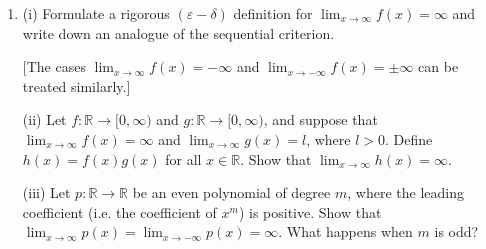 \documentclass[letterpaper,10pt,english]{jupyterBook}
\begin{document}
\label{\detokenize{Problems:id12}}\begin{enumerate}
%
\setcounter{enumi}{11}
\item {} 
\sphinxAtStartPar
(i) Formulate a rigorous \((\varepsilon-\delta)\) definition for \(\displaystyle\lim_{x \rightarrow \infty}f(x) = \infty\) and write down an analogue of the  sequential criterion.

\sphinxAtStartPar
{[}The cases \(\displaystyle\lim_{x \rightarrow \infty}f(x) = -\infty\) and \(\displaystyle\lim_{x \rightarrow -\infty}f(x) = \pm \infty\) can be treated similarly.{]}

\sphinxAtStartPar
(ii) Let \(f:\mathbb{R} \rightarrow [0, \infty)\) and \(g:\mathbb{R} \rightarrow [0, \infty)\), and suppose that \(\displaystyle\lim_{x \rightarrow \infty}f(x) = \infty\) and \(\displaystyle\lim_{x \rightarrow \infty}g(x) = l\), where \(l > 0\). Define \(h(x) = f(x)g(x)\) for all \(x \in \mathbb{R}\). Show that \(\displaystyle\lim_{x \rightarrow \infty}h(x) = \infty\).

\sphinxAtStartPar
(iii) Let \(p: \mathbb{R} \rightarrow \mathbb{R}\) be an even polynomial of degree \(m\), where the leading coefficient (i.e. the coefficient of \(x^{m}\)) is positive. Show that \(\displaystyle\lim_{x \rightarrow \infty}p(x) = \lim_{x \rightarrow -\infty}p(x) = \infty\). What happens when \(m\) is odd?

\end{enumerate}
\end{document}
